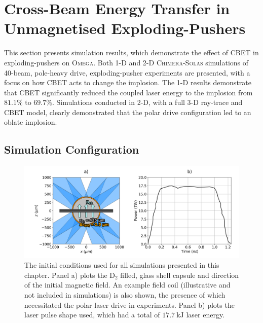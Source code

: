 \section{Cross-Beam Energy Transfer in Unmagnetised Exploding-Pushers}%
\label{sec:Res2_CBET_expl}

This section presents simulation results, which demonstrate the effect of \ac{CBET} in exploding-pushers on \textsc{Omega}.
Both 1-D and 2-D \textsc{Chimera}-\textsc{Solas} simulations of 40-beam, pole-heavy drive, exploding-pusher experiments are presented, with a focus on how \ac{CBET} acts to change the implosion.
The 1-D results demonstrate that \ac{CBET} significantly reduced the coupled laser energy to the implosion from $81.1\%$ to $69.7\%$.
Simulations conducted in 2-D, with a full 3-D ray-trace and \ac{CBET} model, clearly demonstrated that the polar drive configuration led to an oblate implosion. 

\subsection{Simulation Configuration}%
\label{sec:Res2_simconfig}

\begin{figure}[t!]
    \includegraphics[width=\linewidth]{Results2/Images/magpdd_diagram_pulse.png}
    \centering
    \caption{The initial conditions used for all simulations presented in this chapter.
    Panel a) plots the D${}_{2}$ filled, glass shell capsule and direction of the initial magnetic field.
    An example field coil (illustrative and not included in simulations) is also shown, the presence of which necessitated the polar laser drive in experiments.
    Panel b) plots the laser pulse shape used, which had a total of $17.7\ \text{kJ}$ laser energy.}%
    \label{fig:Res2_simconfig}
\end{figure}

